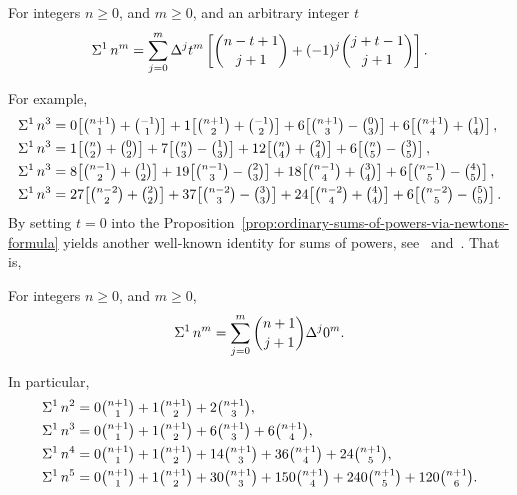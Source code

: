 \begin{proposition}
  \label{prop:negation-of-ordinary-sums-of-powers-via-newtons-formula}
  For integers $n\geq 0$, and $m\geq 0$, and an arbitrary integer $t$
  \begin{align*}
    \Sigma^{1}\,{n}^{m} = \sum_{j=0}^{m} \Delta^{j} t^m
    \left[ \binom{n-t+1}{j+1} + (-1)^j \binom{j+t-1}{j+1} \right].
  \end{align*}
\end{proposition}
For example,
\begin{align*}
  \KnuthRFoldSum{1}{n}{3}
  &= 0\!\left[\tbinom{n+1}{1} + \tbinom{-1}{1}\right]
  +  1\!\left[\tbinom{n+1}{2} + \tbinom{-1}{2}\right]
  +  6\!\left[\tbinom{n+1}{3} - \tbinom{0}{3}\right]
  +  6\!\left[\tbinom{n+1}{4} + \tbinom{1}{4}\right], \\
  \KnuthRFoldSum{1}{n}{3}
  &= 1\!\left[\tbinom{n}{2} + \tbinom{0}{2}\right]
  + 7\!\left[\tbinom{n}{3} - \tbinom{1}{3}\right]
  + 12\!\left[\tbinom{n}{4} + \tbinom{2}{4}\right]
  + 6\!\left[\tbinom{n}{5} - \tbinom{3}{5}\right], \\
  \KnuthRFoldSum{1}{n}{3}
  &= 8\!\left[\tbinom{n-1}{2} + \tbinom{1}{2}\right]
  + 19\!\left[\tbinom{n-1}{3} - \tbinom{2}{3}\right]
  + 18\!\left[\tbinom{n-1}{4} + \tbinom{3}{4}\right]
  + 6\!\left[\tbinom{n-1}{5} - \tbinom{4}{5}\right], \\
  \KnuthRFoldSum{1}{n}{3}
  &= 27\!\left[\tbinom{n-2}{2} + \tbinom{2}{2}\right]
  + 37\!\left[\tbinom{n-2}{3} - \tbinom{3}{3}\right]
  + 24\!\left[\tbinom{n-2}{4} + \tbinom{4}{4}\right]
  + 6\!\left[\tbinom{n-2}{5} - \tbinom{5}{5}\right].
\end{align*}
By setting $t=0$ into the
Proposition~\eqref{prop:ordinary-sums-of-powers-via-newtons-formula}
yields another well-known identity for sums of powers,
see~\cite[p. 190]{graham1994concrete} and~\cite{pfaff2007deriving}.
That is,
\begin{corollary}
  For integers $n \geq 0$, and $m \geq 0$,
  \begin{align*}
    \Sigma^{1}\,{n}^{m} = \sum_{j=0}^{m} \binom{n+1}{j+1} \Delta^{j} 0^m.
  \end{align*}
\end{corollary}
In particular,
\begin{align*}
  \Sigma^{1}\,{n}^{2} &= 0 \tbinom{n+1}{1} + 1 \tbinom{n+1}{2}
  + 2  \tbinom{n+1}{3},
  \\
  \Sigma^{1}\,{n}^{3} &= 0 \tbinom{n+1}{1} + 1 \tbinom{n+1}{2}
  + 6  \tbinom{n+1}{3} + 6   \tbinom{n+1}{4},
  \\
  \Sigma^{1}\,{n}^{4} &= 0 \tbinom{n+1}{1} + 1 \tbinom{n+1}{2}
  + 14 \tbinom{n+1}{3} + 36  \tbinom{n+1}{4} + 24  \tbinom{n+1}{5},
  \\
  \Sigma^{1}\,{n}^{5} &= 0 \tbinom{n+1}{1} + 1 \tbinom{n+1}{2}
  + 30 \tbinom{n+1}{3} + 150 \tbinom{n+1}{4} + 240 \tbinom{n+1}{5}
  + 120 \tbinom{n+1}{6}.
\end{align*}
